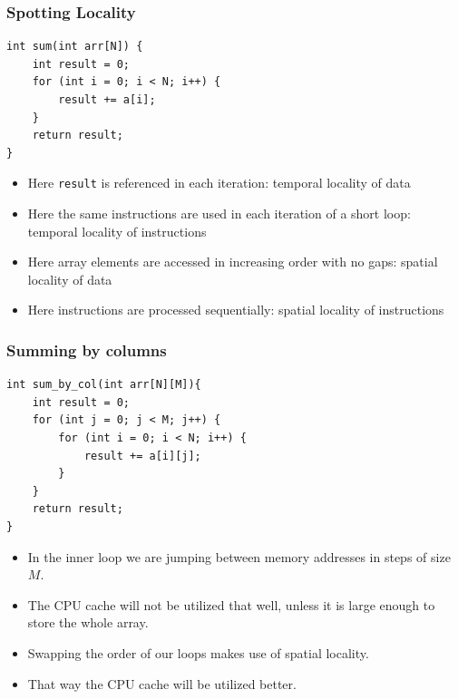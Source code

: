 \documentclass[10pt]{beamer}
\begin{document}
\begin{frame}
    \frametitle{Spotting Locality}
    \begin{scriptsize}
        \begin{verbatim}
int sum(int arr[N]) {
    int result = 0;
    for (int i = 0; i < N; i++) {
        result += a[i];
    }
    return result;
}
        \end{verbatim}
    \end{scriptsize}
    \begin{itemize}
        \item<2-> Here \texttt{result} is referenced in each iteration: temporal locality of data
        \item<3-> Here the same instructions are used in each iteration of a short loop: temporal locality of instructions
        \item<4-> Here array elements are accessed in increasing order with no gaps: spatial locality of data
        \item<5-> Here instructions are processed sequentially: spatial locality of instructions
    \end{itemize}
\end{frame}

\begin{frame}
    \frametitle{Summing by columns}
    \begin{scriptsize}
        \begin{verbatim}
int sum_by_col(int arr[N][M]){
    int result = 0;
    for (int j = 0; j < M; j++) {
        for (int i = 0; i < N; i++) {
            result += a[i][j];
        }
    }
    return result;
}
        \end{verbatim}
    \end{scriptsize}
    \begin{itemize}
        \item<2-> In the inner loop we are jumping between memory addresses in steps of size $M$.
        \item<3-> The CPU cache will not be utilized that well, unless it is large enough to store the whole array.
        \item<4-> Swapping the order of our loops makes use of spatial locality.
        \item<5-> That way the CPU cache will be utilized better.
    \end{itemize}
\end{frame}
\end{document}
